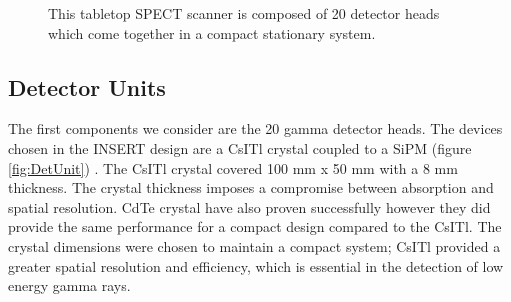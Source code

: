 \begin{figure}[!tbp]
  \centering
  \hfill
  \caption{This tabletop SPECT scanner is composed of 20 detector heads which come together in a compact stationary system.}
\end{figure}

\subsection{Detector Units}
The first components we consider are the 20 gamma detector heads.  The devices chosen in the INSERT design are a \acrshort{CsITl} crystal coupled to a \acrshort{SiPM} (figure \ref{fig:DetUnit}) \cite{7430864} \cite{Occhipinti2016AApplications}. The \acrshort{CsITl} crystal covered 100 mm x 50 mm with a 8 mm thickness. The crystal thickness imposes a compromise between absorption and spatial resolution. \acrshort{CdTe} crystal have also proven successfully \cite{Cai2010ADetectors} however they did provide the same performance for a compact design compared to the \acrshort{CsITl}. The crystal dimensions were chosen to maintain a compact system; \acrshort{CsITl} provided a greater spatial resolution and efficiency, which is essential in the detection of low energy gamma rays.

